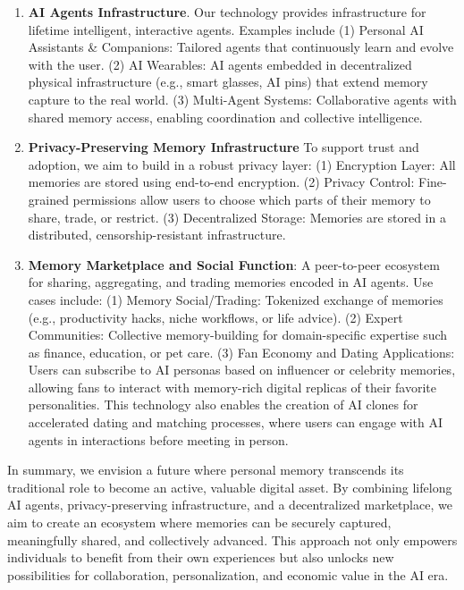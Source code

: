 \begin{enumerate}[leftmargin=*]
    \item \textbf{AI Agents Infrastructure}. Our technology provides infrastructure for lifetime intelligent, interactive agents. Examples include (1) Personal AI Assistants \& Companions: Tailored agents that continuously learn and evolve with the user. (2) AI Wearables: AI agents embedded in decentralized physical infrastructure (e.g., smart glasses, AI pins) that extend memory capture to the real world. (3) Multi-Agent Systems: Collaborative agents with shared memory access, enabling coordination and collective intelligence.
    \item \textbf{Privacy-Preserving Memory Infrastructure} To support trust and adoption, we aim to build in a robust privacy layer: (1) Encryption Layer: All memories are stored using end-to-end encryption. (2) Privacy Control: Fine-grained permissions allow users to choose which parts of their memory to share, trade, or restrict. (3) Decentralized Storage: Memories are stored in a distributed, censorship-resistant infrastructure.
    \item \textbf{Memory Marketplace and Social Function}: A peer-to-peer ecosystem for sharing, aggregating, and trading memories encoded in AI agents. Use cases include: (1) Memory Social/Trading: Tokenized exchange of memories (e.g., productivity hacks, niche workflows, or life advice). (2) Expert Communities: Collective memory-building for domain-specific expertise such as finance, education, or pet care. (3) Fan Economy and Dating Applications: Users can subscribe to AI personas based on influencer or celebrity memories, allowing fans to interact with memory-rich digital replicas of their favorite personalities. This technology also enables the creation of AI clones for accelerated dating and matching processes, where users can engage with AI agents in interactions before meeting in person.
\end{enumerate}

In summary, we envision a future where personal memory transcends its traditional role to become an active, valuable digital asset. By combining lifelong AI agents, privacy-preserving infrastructure, and a decentralized marketplace, we aim to create an ecosystem where memories can be securely captured, meaningfully shared, and collectively advanced. This approach not only empowers individuals to benefit from their own experiences but also unlocks new possibilities for collaboration, personalization, and economic value in the AI era.








